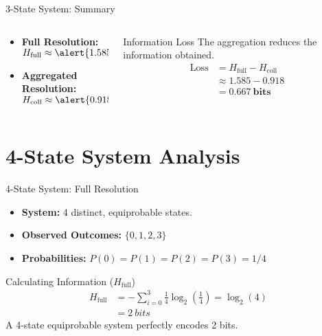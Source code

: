 \documentclass{beamer}
\newcommand{\Hfull}{H_{\text{full}}}
\newcommand{\Hcoll}{H_{\text{coll}}}
\begin{document}
\begin{frame}{3-State System: Summary}
    \begin{columns}[T] %
        \begin{column}{0.5\textwidth}
            \begin{itemize}
                \item \textbf{Full Resolution:} \\ $\Hfull \approx \alert{\SI{1.585}{bits}}$
                \vspace{1em}
                \item \textbf{Aggregated Resolution:} \\ $\Hcoll \approx \alert{\SI{0.918}{bits}}$
            \end{itemize}
        \end{column}
        \begin{column}{0.5\textwidth}
            \pause
            \begin{block}{Information Loss}
                The aggregation reduces the information obtained.
                \begin{align*}
                    \text{Loss} &= \Hfull - \Hcoll \\
                    &\approx 1.585 - 0.918 \\
                    &= \mathbf{\SI{0.667}{bits}}
                \end{align*}
            \end{block}
        \end{column}
    \end{columns}
\end{frame}

\section{4-State System Analysis}
\begin{frame}{4-State System: Full Resolution}
    \begin{itemize}
        \item \textbf{System:} 4 distinct, equiprobable states.
        \item \textbf{Observed Outcomes:} $\{0, 1, 2, 3\}$
        \item \textbf{Probabilities:} $P(0) = P(1) = P(2) = P(3) = 1/4$
    \end{itemize}
    \pause
    \begin{block}{Calculating Information ($\Hfull$)}
        \begin{align*}
            \Hfull &= - \sum_{i=0}^{3} \frac{1}{4} \log_2 \left(\frac{1}{4}\right) = \log_2(4) \\
            &= \SI{2}{bits}
        \end{align*}
        \alert{A 4-state equiprobable system perfectly encodes 2 bits.}
    \end{block}
\end{frame}
\end{document}
